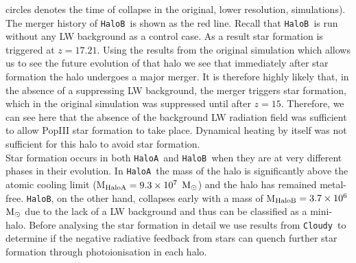 \documentclass[twocolumn,iop,revtex4]{openjournal}
\newcommand{\cloudy}{\texttt{Cloudy~}}
\newcommand{\msolar} {$\rm{M_{\odot}}~$}
\newcommand{\msolarc} {$\rm{M_{\odot}}$}
\newcommand{\ha} {\texttt{HaloA~}}
\newcommand{\hb} {\texttt{HaloB~}}
\newcommand{\hbc} {\texttt{HaloB}}
\begin{document}
circles denotes the time of collapse in the original, lower resolution, simulations). The merger
history of \hb is shown as the red line. Recall that \hb is run without any LW background as
a control case. As a
result star formation is triggered at $z = 17.21$. Using the results from the original simulation
which allows us to see the future evolution of that halo we see that immediately after star formation
the halo undergoes a major merger. It is therefore highly likely that, in the absence of a suppressing
LW background, the merger triggers star formation, which in the original simulation was
suppressed until after $z = 15$. Therefore, we can see here that the absence of the background
LW radiation field was sufficient to allow PopIII star formation to take place. Dynamical heating
by itself was not sufficient for this halo to avoid star formation. \\
\indent Star formation occurs in both \ha and \hb when they are at very different phases in
their evolution.
In \ha the mass of the halo is significantly above the atomic cooling limit
(M$_{\rm{HaloA}} = 9.3 \times 10^7$ \msolarc) and the halo has
remained metal-free. \hbc, on the other hand, collapses early with a mass of
M$_{\rm{HaloB}} = 3.7 \times 10^6$ \msolar due to the lack of a LW background and thus can
be classified as a mini-halo. Before analysing the star formation in detail we use results
from \cloudy to determine if the negative radiative feedback from stars can
quench further star formation through photoionisation in each halo. 
\end{document}
